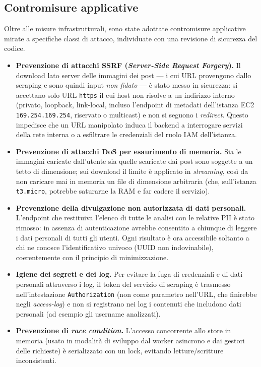 \documentclass[11pt,a4paper]{article}
\begin{document}
\subsection{Contromisure applicative}
Oltre alle misure infrastrutturali, sono state adottate contromisure applicative
mirate a specifiche classi di attacco, individuate con una revisione di sicurezza del
codice.
\begin{itemize}[nosep]
  \item \textbf{Prevenzione di attacchi SSRF (\emph{Server-Side Request Forgery}).} Il
        download lato server delle immagini dei post --- i cui URL provengono dallo
        scraping e sono quindi input \emph{non fidato} --- è stato messo in sicurezza:
        si accettano solo URL \texttt{https} il cui host non risolve a un indirizzo
        interno (privato, loopback, link-local, incluso l'endpoint di metadati
        dell'istanza EC2 \texttt{169.254.169.254}, riservato o multicast) e non si seguono
        i \emph{redirect}. Questo impedisce che un URL manipolato induca il backend a
        interrogare servizi della rete interna o a esfiltrare le credenziali del ruolo
        IAM dell'istanza.
  \item \textbf{Prevenzione di attacchi DoS per esaurimento di memoria.} Sia le immagini
        caricate dall'utente sia quelle scaricate dai post sono soggette a un tetto di
        dimensione; sui download il limite è applicato in \emph{streaming}, così da non
        caricare mai in memoria un file di dimensione arbitraria (che, sull'istanza
        \texttt{t3.micro}, potrebbe saturarne la RAM e far cadere il servizio).
  \item \textbf{Prevenzione della divulgazione non autorizzata di dati personali.}
        L'endpoint che restituiva l'elenco di tutte le analisi con le relative PII è stato
        rimosso: in assenza di autenticazione avrebbe consentito a chiunque di leggere i
        dati personali di tutti gli utenti. Ogni risultato è ora accessibile soltanto a
        chi ne conosce l'identificativo univoco (UUID non indovinabile), coerentemente con
        il principio di minimizzazione.
  \item \textbf{Igiene dei segreti e dei log.} Per evitare la fuga di credenziali e di
        dati personali attraverso i log, il token del servizio di scraping è trasmesso
        nell'intestazione \texttt{Authorization} (non come parametro nell'URL, che
        finirebbe negli \emph{access-log}) e non si registrano nei log i contenuti che
        includono dati personali (ad esempio gli username analizzati).
  \item \textbf{Prevenzione di \emph{race condition}.} L'accesso concorrente allo store
        in memoria (usato in modalità di sviluppo dal worker asincrono e dai gestori delle
        richieste) è serializzato con un lock, evitando letture/scritture inconsistenti.
\end{itemize}
\end{document}
